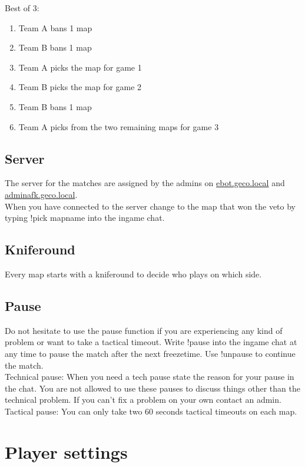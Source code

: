 \documentclass{article}
\begin{document}
Best of 3:
\begin{enumerate}
\item Team A bans 1 map
\item Team B bans 1 map
\item Team A picks the map for game 1
\item Team B picks the map for game 2
\item Team B bans 1 map
\item Team A picks from the two remaining maps for game 3
\end{enumerate}

\subsection{Server}
The server for the matches are assigned by the admins on \href{http://ebot.geco.local}{ebot.geco.local} and \href{http://adminafk.geco.local/pages/veto.php}{adminafk.geco.local}.\\
When you have connected to the server change to the map that won the veto by typing {\selectfont 
!pick mapname} into the ingame chat.

\subsection{Kniferound}
Every map starts with a kniferound to decide who plays on which side.


\subsection{Pause}
\label{sec:pause}
Do not hesitate to use the pause function if you are experiencing any kind of problem or want to take a tactical timeout. Write {\selectfont !pause} into the ingame chat at any time to pause the match after the next freezetime. Use {\selectfont 
!unpause} to continue the match. 
\\Technical pause: When you need a tech pause state the reason for your pause in the chat. You are not allowed to use these pauses to discuss things other than the technical problem. If you can't fix a problem on your own contact an admin.
\\Tactical pause: You can only take two 60 seconds tactical timeouts on each map.


\section{Player settings}
\end{document}
